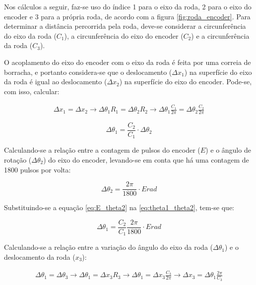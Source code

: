 Nos cálculos a seguir, faz-se uso do índice 1 para o eixo da roda, 2 para o eixo do encoder e 3 para a própria roda, de acordo com a figura \ref{fig:roda_encoder}. Para determinar a distância percorrida pela roda, deve-se considerar a circunferência do eixo da roda ($C_1$), a circunferência do eixo do encoder ($C_2$) e a circunferência da roda ($C_3$).

O acoplamento do eixo do encoder com o eixo da roda é feita por uma correia de borracha, e portanto considera-se que o deslocamento ($ \Delta x_1$) na superfície do eixo da roda é igual ao deslocamento ($ \Delta x_2$) na superfície do eixo do encoder. Pode-se, com isso, calcular:

\begin{eqnarray*}
   \Delta x_1 =  \Delta x_2 \rightarrow \Delta \theta_1 R_1 = \Delta \theta_2 R_2 \rightarrow \Delta \theta_1 \frac{C_1}{2 \pi} = \Delta \theta_2 \frac{C_2}{2 \pi} 
\end{eqnarray*}

\begin{equation}
  \Delta \theta_1 = \frac{C_2}{C_1} \cdot \Delta \theta_2
  \label{eq:theta1_theta2}
\end{equation}

Calculando-se a relação entre a contagem de pulsos do encoder ($E$) e o ângulo de rotação ($\Delta \theta_2$) do eixo do encoder, levando-se em conta que há uma contagem de 1800 pulsos por volta:

\begin{equation}
  \Delta \theta_2 = \frac{2 \pi}{1800} \cdot E \unit{rad}
  \label{eq:E_theta2}
\end{equation}

Substituindo-se a equação \ref{eq:E_theta2} na \ref{eq:theta1_theta2}, tem-se que:

\begin{equation}
  \Delta \theta_1 = \frac{C_2}{C_1} \frac{2 \pi}{1800} \cdot E \unit{rad}
  \label{eq:theta_1}
\end{equation}

Calculando-se a relação entre a variação do ângulo do eixo da roda ($\Delta \theta_1$) e o deslocamento da roda ($x_3$):

\begin{eqnarray*}
  \Delta \theta_1 = \Delta \theta_3 \rightarrow \Delta \theta_1 =  \Delta x_3 R_3 \rightarrow \Delta \theta_1 = \Delta x_3 \frac{C_3}{2 \pi} \rightarrow  \Delta x_3 = \Delta \theta_1 \frac{2 \pi}{C_3}
\end{eqnarray*}

